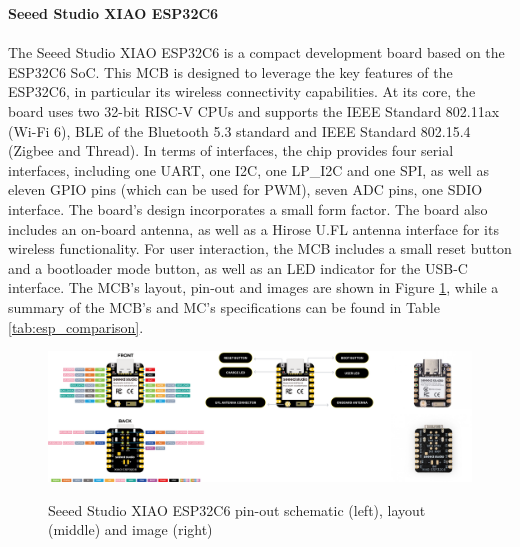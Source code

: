 \textbf{Seeed Studio XIAO ESP32C6}\\\\
The Seeed Studio XIAO ESP32C6 is a compact development board based on the ESP32C6 SoC. This MCB is designed to leverage the key features of the ESP32C6, in particular its wireless connectivity capabilities. At its core, the board uses two 32-bit RISC-V CPUs and supports the IEEE Standard 802.11ax (Wi-Fi 6), BLE of the Bluetooth 5.3 standard and IEEE Standard 802.15.4 (Zigbee and Thread).
In terms of interfaces, the chip provides four serial interfaces, including one UART, one I2C, one LP\_I2C and one SPI, as well as eleven GPIO pins (which can be used for PWM), seven ADC pins, one SDIO interface. The board's design incorporates a small form factor. 
The board also includes an on-board antenna, as well as a Hirose U.FL antenna interface for its wireless functionality. For user interaction, the MCB includes a small reset button and a bootloader mode button, as well as an LED indicator for the USB-C interface. The MCB's layout, pin-out and images are shown in Figure \ref{fig:esp32c6}, while a summary of the MCB's and MC's specifications can be found in Table \ref{tab:esp_comparison}.  \citep{espressif_systems_esp32-c6_2024, seeed_studio_seeed_2024-1}
\begin{figure}[H]
    \centering
    \includegraphics[width=.6\textwidth]{overleaf/images/xiaoesp32c6.png}
    \\\vspace{\ftspace}
    \caption{Seeed Studio XIAO ESP32C6 pin-out schematic (left), layout (middle) and image (right) \citep[adapted from][]{seeed_studio_seeed_2024-1}}
    \label{fig:esp32c6}
\end{figure}

